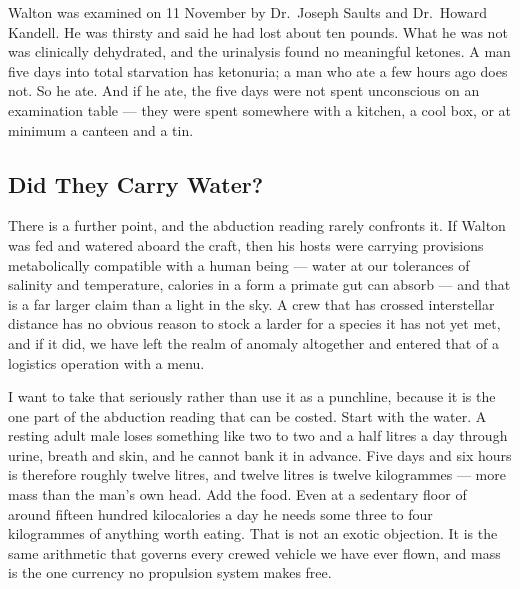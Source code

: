 Walton was examined on 11 November by Dr.~Joseph Saults and Dr.~Howard Kandell. He was thirsty
and said he had lost about ten pounds. What he was not was clinically dehydrated, and the
urinalysis found no meaningful ketones.  A man five
days into total starvation has ketonuria; a man who ate a few hours ago does not. So he ate. And
if he ate, the five days were not spent unconscious on an examination table --- they were spent
somewhere with a kitchen, a cool box, or at minimum a canteen and a tin.

\subsection{Did They Carry Water?}

There is a further point, and the abduction reading rarely confronts it. If Walton was fed and
watered aboard the craft, then his hosts were carrying provisions metabolically compatible with
a human being --- water at our tolerances of salinity and temperature, calories in a form a
primate gut can absorb --- and that is a far larger claim than a light in the sky. A crew that
has crossed interstellar distance has no obvious reason to stock a larder for a species it has
not yet met, and if it did, we have left the realm of anomaly altogether and entered that of a
logistics operation with a menu.

I want to take that seriously rather than use it as a punchline, because it is the one part of
the abduction reading that can be costed. Start with the water. A resting adult male loses
something like two to two and a half litres a day through urine, breath and skin, and he cannot
bank it in advance. Five days and six hours is therefore roughly twelve litres, and twelve
litres is twelve kilogrammes --- more mass than the man's own head. Add the food. Even at a
sedentary floor of around fifteen hundred kilocalories a day he needs some three to four
kilogrammes of anything worth eating.  That is not an exotic
objection. It is the same arithmetic that governs every crewed vehicle we have ever flown, and
mass is the one currency no propulsion system makes free.

